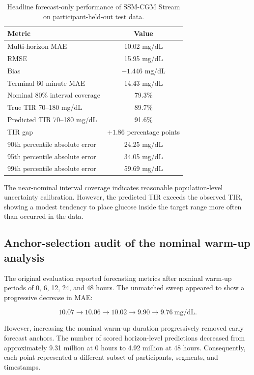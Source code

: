 \begin{table}[H]
\centering
\caption{Headline forecast-only performance of SSM-CGM Stream on
participant-held-out test data.}
\label{tab:stream_headline_metrics}
\begin{tabular}{lc}
\toprule
Metric & Value \\
\midrule
Multi-horizon MAE & 10.02 mg/dL \\
RMSE & 15.95 mg/dL \\
Bias & $-1.446$ mg/dL \\
Terminal 60-minute MAE & 14.43 mg/dL \\
Nominal 80\% interval coverage & 79.3\% \\
True TIR 70--180 mg/dL & 89.7\% \\
Predicted TIR 70--180 mg/dL & 91.6\% \\
TIR gap & $+1.86$ percentage points \\
90th percentile absolute error & 24.25 mg/dL \\
95th percentile absolute error & 34.05 mg/dL \\
99th percentile absolute error & 59.69 mg/dL \\
\bottomrule
\end{tabular}
\end{table}

The near-nominal interval coverage indicates reasonable population-level
uncertainty calibration. However, the predicted TIR exceeds the observed TIR,
showing a modest tendency to place glucose inside the target range more often
than occurred in the data.

\subsection{Anchor-selection audit of the nominal warm-up analysis}
\label{subsec:warmup_anchor_selection_audit}

The original evaluation reported forecasting metrics after nominal warm-up
periods of 0, 6, 12, 24, and 48 hours. The unmatched sweep appeared to show a
progressive decrease in MAE:

\begin{equation}
10.07
\rightarrow
10.06
\rightarrow
10.02
\rightarrow
9.90
\rightarrow
9.76~\mathrm{mg/dL}.
\end{equation}

However, increasing the nominal warm-up duration progressively removed early
forecast anchors. The number of scored horizon-level predictions decreased
from approximately 9.31 million at 0 hours to 4.92 million at 48 hours.
Consequently, each point represented a different subset of participants,
segments, and timestamps.

